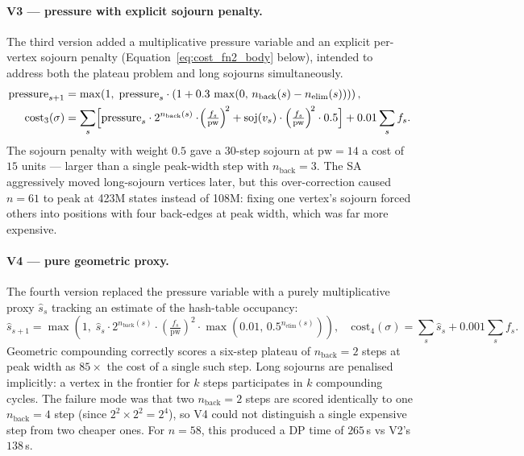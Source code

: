 \documentclass[12pt]{article}
\theoremstyle{definition}
\newcommand{\pw}{\mathrm{pw}}
\newcommand{\nb}{n_{\mathrm{back}}}
\newcommand{\proxy}{\hat{s}}   %
\begin{document}
\paragraph{V3 — pressure with explicit sojourn penalty.}
The third version added a multiplicative pressure variable and an
explicit per-vertex sojourn penalty (Equation~\ref{eq:cost_fn2_body}
below), intended to address both the plateau problem and long sojourns
simultaneously.
\begin{align}
  \mathrm{pressure}_{s+1} &= \max\!\left(1,\; \mathrm{pressure}_s
      \cdot (1 + 0.3\,\max(0,\, \nb(s) - n_\mathrm{elim}(s)))\right),
      \notag \\
  \mathrm{cost}_3(\sigma)
    &= \sum_s \Bigl[
        \mathrm{pressure}_s \cdot 2^{\nb(s)} \cdot \!\left(\tfrac{f_s}{\pw}\right)^{\!2}
        + \mathrm{soj}(v_s) \cdot \left(\tfrac{f_s}{\pw}\right)^{\!2} \cdot 0.5
      \Bigr]
      + 0.01 \sum_s f_s.
  \label{eq:cost_fn2_body}
\end{align}
The sojourn penalty with weight $0.5$ gave a 30-step sojourn at
$\pw = 14$ a cost of $15$ units — larger than a single peak-width step
with $\nb = 3$.
The SA aggressively moved long-sojourn vertices later, but this
over-correction caused $n=61$ to peak at 423M states instead of 108M:
fixing one vertex's sojourn forced others into positions with four
back-edges at peak width, which was far more expensive.

\paragraph{V4 — pure geometric proxy.}
The fourth version replaced the pressure variable with a purely
multiplicative proxy $\proxy_s$ tracking an estimate of the hash-table
occupancy:
\begin{equation}
  \proxy_{s+1} = \max\!\left(1,\; \proxy_s
      \cdot 2^{\nb(s)} \cdot \!\left(\tfrac{f_s}{\pw}\right)^{\!2}
      \cdot \max\!\left(0.01,\, 0.5^{n_\mathrm{elim}(s)}\right)\right),
  \quad
  \mathrm{cost}_4(\sigma) = \sum_s \proxy_s + 0.001 \sum_s f_s.
\end{equation}
Geometric compounding correctly scores a six-step plateau of $\nb=2$
steps at peak width as $85\times$ the cost of a single such step.
Long sojourns are penalised implicitly: a vertex in the frontier for
$k$ steps participates in $k$ compounding cycles.
The failure mode was that two $\nb=2$ steps are scored identically to
one $\nb=4$ step (since $2^2 \times 2^2 = 2^4$), so V4 could not
distinguish a single expensive step from two cheaper ones.
For $n=58$, this produced a DP time of $265$\,s vs V2's $138$\,s.
\end{document}
